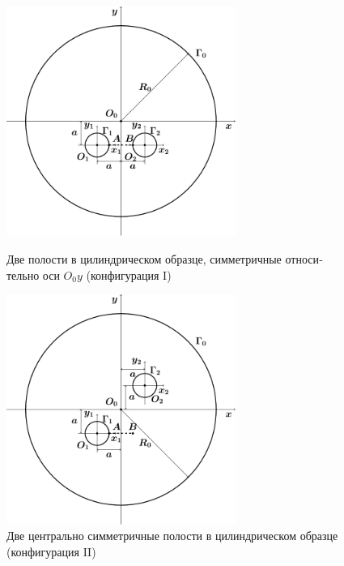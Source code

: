 \begin{russian}
\begin{figure}
\centering\footnotesize
\parbox[b]{7.5cm}{\centering\includegraphics[width=7.5cm]{cav2a.pdf}
\caption{Две полости в цилиндрическом образце, симметричные относительно оси $O_0y$ (конфигурация I)
\label{f:7:10a}}}\hfil\hfil
\parbox[b]{7.5cm}{\centering\includegraphics[width=7.5cm]{cav2b.pdf}
\caption{Две центрально симметричные полости в цилиндрическом образце (конфигурация II)
\label{f:7:10b}}}
\end{figure}


\end{russian}
